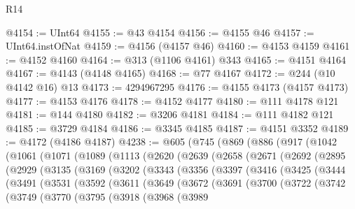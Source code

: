 \begin{lexlean}{R14}
\begin{coremodule}
@4154 := UInt64
@4155 := @43 @4154
@4156 := @4155 @46
@4157 := UInt64.instOfNat
@4159 := @4156 (@4157 @46)
@4160 := @4153 @4159
@4161 := @4152 @4160
@4164 := @313 (@1106 @4161) @343
@4165 := @4151 @4164
@4167 := @4143 (@4148 @4165)
@4168 := @77 @4167
@4172 := @244 (@10 @4142 @16) @13
@4173 := 4294967295
@4176 := @4155 @4173 (@4157 @4173)
@4177 := @4153 @4176
@4178 := @4152 @4177
@4180 := @111 @4178 @121
@4181 := @144 @4180
@4182 := @3206 @4181
@4184 := @111 @4182 @121
@4185 := @3729 @4184
@4186 := @3345 @4185
@4187 := @4151 @3352
@4189 := @4172 (@4186 @4187)
@4238 := @605
    (@745
      (@869
        (@886
          (@917
            (@1042
              (@1061
                (@1071
                  (@1089
                    (@1113
                      (@2620
                        (@2639
                          (@2658
                            (@2671
                              (@2692
                                (@2895
                                  (@2929
                                    (@3135
                                      (@3169
                                        (@3202
                                          (@3343
                                            (@3356
                                              (@3397
                                                (@3416
                                                  (@3425
                                                    (@3444
                                                      (@3491
                                                        (@3531
                                                          (@3592
                                                            (@3611
                                                              (@3649
                                                                (@3672
                                                                  (@3691
                                                                    (@3700
                                                                      (@3722
                                                                        (@3742
                                                                          (@3749
                                                                            (@3770
                                                                              (@3795
                                                                                (@3918
                                                                                  (@3968
                                                                                    (@3989

\end{coremodule}
\end{lexlean}
